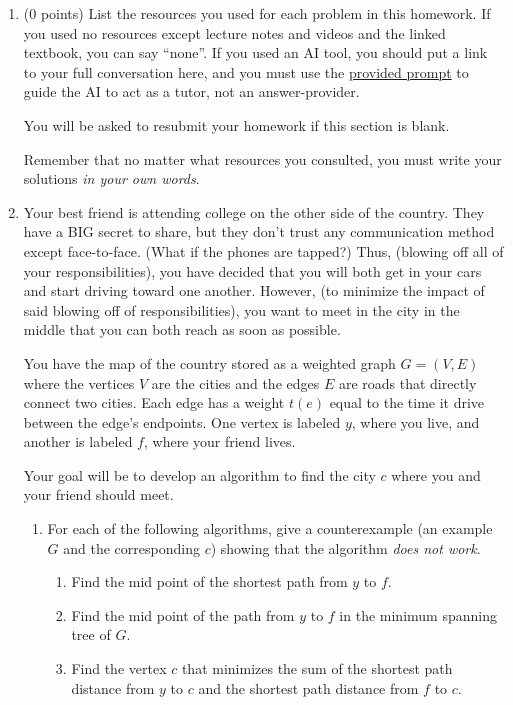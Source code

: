 \documentclass[11pt]{article}
\begin{document}


\begin{enumerate}


\item (0 points) List the resources you used for each problem in this homework. If you used no resources except
lecture notes and videos and the linked textbook, you can say ``none''. If you used
an AI tool, you should put a link to your full conversation here, and you must
use the
\href{https://umaal.org/files/teaching/csci332_fall2026/agents.md}{provided
prompt}
 to guide the AI to act
as a tutor, not an answer-provider.

You will be asked to resubmit your homework if this section is blank.

Remember that no matter what resources you consulted, you must write your solutions
\emph{in your own words}.

\item Your best friend is attending college on the other side of the country. They have
a BIG secret to share, but they don't trust any communication method except face-to-face. (What if the phones
are tapped?) Thus, (blowing off all of your responsibilities), you have decided that you will
both get in your cars and start driving toward one another. However,
(to minimize the impact of said blowing off of responsibilities), you want to meet in the city in the middle
that you can both reach as soon as possible.

You have the map of the country stored as a weighted graph $G=(V, E)$
where the vertices $V$ are the cities and the edges $E$ are roads
that directly connect two cities. Each edge has a weight $t(e)$
equal to the time it drive between the edge's endpoints.
One vertex is labeled $y$, where you live, and another is labeled $f$,
where your friend lives.

Your goal will be to develop an algorithm to find the city $c$
where you and your friend should meet.

\begin{enumerate}
  \item For each of the following algorithms, give a counterexample
  (an example $G$ and the corresponding $c$) showing that the algorithm
  \emph{does not work}.

  \begin{enumerate}
    \item Find the mid point of the shortest path from $y$ to $f$.
    \item Find the mid point of the path from $y$ to $f$ in the minimum spanning tree of $G$.
    \item Find the vertex $c$ that minimizes the sum of the shortest path
    distance from $y$ to $c$ and the shortest path distance from $f$ to $c$.
  \end{enumerate}


\end{enumerate}
\end{enumerate}
\end{document}
